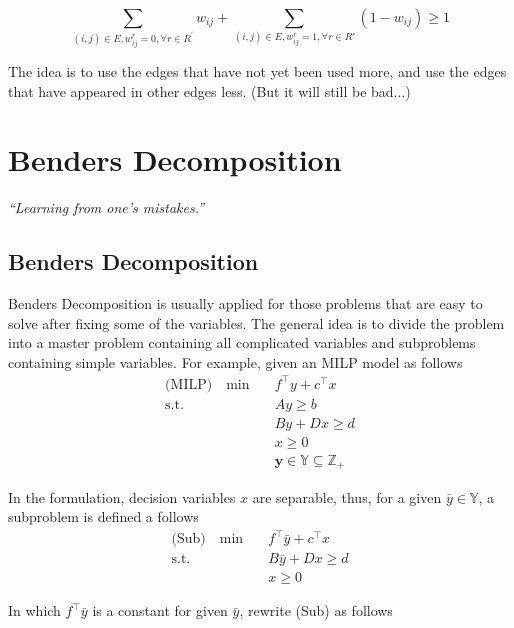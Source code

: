             \begin{equation*}
                \sum_{(i, j) \in E, w_{ij}^r = 0, \forall r \in R^\prime} w_{ij} + \sum_{(i, j) \in E, w_{ij}^r = 1, \forall r \in R'} (1 - w_{ij}) \ge 1
            \end{equation*}

            The idea is to use the edges that have not yet been used more, and use the edges that have appeared in other edges less. (But it will still be bad...)
        
    \chapter{Benders Decomposition}
        \begin{center}
            \textit{``Learning from one's mistakes.''}
        \end{center}
        \section{Benders Decomposition}
            Benders Decomposition is usually applied for those problems that are easy to solve after fixing some of the variables. The general idea is to divide the problem into a master problem containing all complicated variables and subproblems containing simple variables. For example, given an MILP model as follows
            \begin{align*}
                \text{(MILP)} \quad \min \quad & f^\top y + c^\top x \\
                \text{s.t.} \quad & A y \ge b \\
                & By + Dx \ge d\\
                & x \ge 0\\
                & \mathbf{y} \in \mathbb{Y} \subseteq \mathbb{Z}_+
            \end{align*}

            In the formulation, decision variables $x$ are separable, thus, for a given $\bar{y} \in \mathbb{Y}$, a subproblem is defined a follows
            \begin{align*}
                \text{(Sub)} \quad \min \quad & f^\top \bar{y} + c^\top x\\
                \text{s.t.} \quad & B \bar{y} + Dx \ge d\\
                & x \ge 0
            \end{align*}

            In which $f^\top \bar{y}$ is a constant for given $\bar{y}$, rewrite (Sub) as follows

